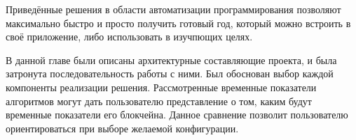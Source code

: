 \tab[0.88cm]Приведённые решения в области автоматизации программирования
позволяют максимально быстро и просто получить готовый год, который можно
встроить в своё приложение, либо использовать в изучпющих целях. 

В данной главе были описаны архитектурные составляющие проекта, и была
затронута последовательность работы с ними. Был обоснован выбор каждой
компоненты реализации решения. Рассмотренные временные показатели алгоритмов
могут дать пользователю представление о том, каким будут временные показатели
его блокчейна. Данное сравнение позволит пользователю ориентироваться при
выборе желаемой конфигурации.
